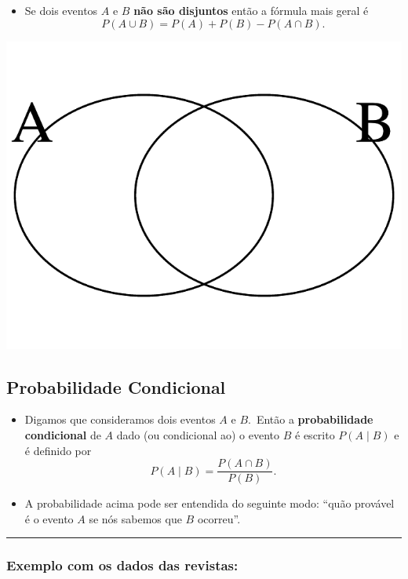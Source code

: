 \documentclass[]{article}
\providecommand{\tightlist}{%
  \setlength{\itemsep}{0pt}\setlength{\parskip}{0pt}}
\begin{document}
\begin{itemize}
\tightlist
\item
  Se dois eventos \(A\) e \(B\) \textbf{não são disjuntos} então a
  fórmula mais geral é \[
    P(A \cup B) = P(A) + P(B) - P(A \cap B).
    \]
\end{itemize}

\includegraphics{probability_files/figure-latex/unnamed-chunk-9-1.pdf}

\subsection{Probabilidade Condicional}\label{probabilidade-condicional}

\begin{itemize}
\tightlist
\item
  Digamos que consideramos dois eventos \(A\) e \(B\).~Então a
  \textbf{probabilidade condicional} de \(A\) dado (ou condicional ao) o
  evento \(B\) é escrito \(P(A \mid B)\) e é definido por
  \[P(A \mid B)=\frac{P(A \cap B)}{P(B)}.\]
\item
  A probabilidade acima pode ser entendida do seguinte modo: ``quão
  provável é o evento \(A\) se nós sabemos que \(B\) ocorreu''.
\end{itemize}

\begin{center}\rule{0.5\linewidth}{\linethickness}\end{center}

\subsubsection{Exemplo com os dados das
revistas:}\label{exemplo-com-os-dados-das-revistas}
\end{document}
